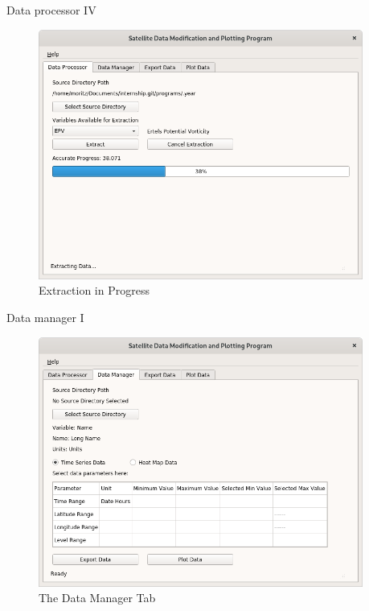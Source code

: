 \documentclass[
    hyperref={
        final,
        colorlinks=true,
        menucolor=black,
        anchorcolor=green,
        linkcolor=blue,
        citecolor=red,
        pdftitle={RS RAS Internship Presentation},
        pdfauthor={Moritz M. Konarski}
    }
]{beamer}
\begin{document}
\begin{frame}{Data processor IV}
\begin{figure}
    \includegraphics[width=0.95\textwidth]{../graphics/dp04}
    \vspace{-8pt}
    \caption{Extraction in Progress}
\end{figure}
\end{frame}

\begin{frame}{Data manager I}
\begin{figure}
    \includegraphics[width=0.95\textwidth]{../graphics/dm01}
    \vspace{-8pt}
    \caption{The Data Manager Tab}
\end{figure}
\end{frame}
\end{document}
